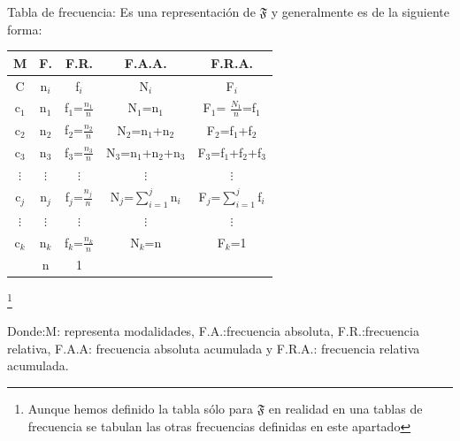 \begin{definition}
Tabla de frecuencia\bigskip: Es una representaci\'{o}n de $\mathfrak{F}$ y
generalmente es de la siguiente forma:%

\begin{tabular}
[c]{||c||c||c||c||c||}\hline\hline
{\small M} & {\small F.} & {\small F.R.} & {\small F.A.A.} & {\small F.R.A.}%
\\\hline\hline
{\small C} & {\small n}$_{i}$ & {\small f}$_{i}$ & {\small N}$_{i}$ &
{\small F}$_{i}$\\\hline\hline
{\small c}$_{1}$ & {\small n}$_{1}$ & {\small f}$_{1}${\small =}$\frac{n_{1}%
}{n}$ & {\small N}$_{1}${\small =n}$_{1}$ & {\small F}$_{1}${\small =}%
$\frac{N_{1}}{n}${\small =f}$_{1}$\\\hline\hline
{\small c}$_{2}$ & {\small n}$_{2}$ & {\small f}$_{2}${\small =}$\frac{n_{2}%
}{n}$ & {\small N}$_{2}${\small =n}$_{1}${\small +n}$_{2}$ & {\small F}$_{2}%
${\small =f}$_{1}${\small +f}$_{2}$\\\hline\hline
{\small c}$_{3}$ & {\small n}$_{3}$ & {\small f}$_{3}${\small =}$\frac{n_{3}%
}{n}$ & {\small N}$_{3}${\small =n}$_{1}${\small +n}$_{2}${\small +n}$_{3}$ &
{\small F}$_{3}${\small =f}$_{1}${\small +f}$_{2}${\small +f}$_{3}%
$\\\hline\hline
$\vdots$ & $\vdots$ & $\vdots$ & $\vdots$ & $\vdots$\\\hline\hline
{\small c}$_{j}$ & {\small n}$_{j}$ & {\small f}$_{j}${\small =}$\frac{n_{j}%
}{n}$ & {\small N}$_{j}${\small =}$\sum_{i=1}^{j}${\small n}$_{i}$ &
{\small F}$_{j}${\small =}$\sum_{i=1}^{j}${\small f}$_{i}$\\\hline\hline
$\vdots$ & $\vdots$ & $\vdots$ & $\vdots$ & $\vdots$\\\hline\hline
{\small c}$_{k}$ & {\small n}$_{k}$ & {\small f}$_{k}${\small =}$\frac{n_{k}%
}{n}$ & {\small N}$_{k}${\small =n} & {\small F}$_{k}${\small =1}%
\\\hline\hline
& {\small n} & {\small 1} &  & \\\hline\hline
\end{tabular}
\footnote{Aunque hemos definido la tabla s\'{o}lo para $\mathfrak{F}$ en
realidad en una tablas de frecuencia se tabulan las otras frecuencias
definidas en este apartado}
\end{definition}

Donde:M: representa modalidades, \newline F.A.:frecuencia absoluta,
F.R.:frecuencia relativa, F.A.A: frecuencia absoluta acumulada y F.R.A.:
frecuencia relativa acumulada.


